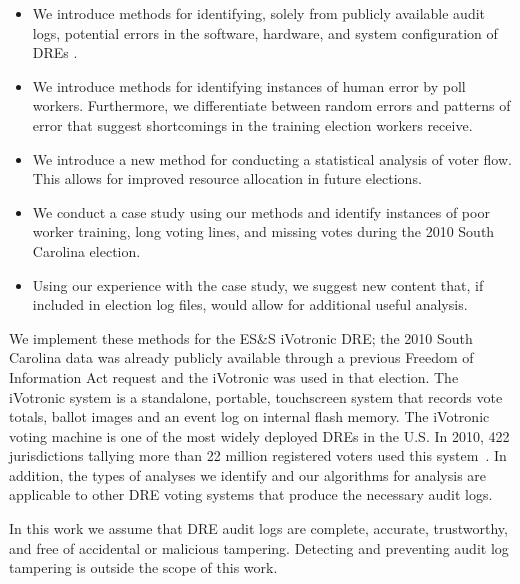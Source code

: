 \documentclass[letterpaper,twocolumn,10pt]{article}
\begin{document}
\begin{itemize}
\item We introduce methods for identifying, solely from publicly available audit
  logs, potential errors in the software, hardware, and system configuration of
  DREs .
\item We introduce methods for identifying instances of human error by poll
  workers. Furthermore, we differentiate between random
  errors and patterns of error that suggest shortcomings in the training
  election workers receive.
\item We introduce a new method for conducting a statistical analysis of voter
  flow. This allows for improved resource allocation in future elections.
\item We conduct a case study using our methods and identify instances of poor
  worker training, long voting lines, and missing votes during the 2010 South
  Carolina election.
\item Using our experience with the case study, we suggest new content that, if
  included in election log files, would allow for additional useful analysis.
\end{itemize}

We implement these methods for the ES\&S 
iVotronic DRE; the 2010 South Carolina data was already publicly available 
through a previous Freedom of Information Act request and the iVotronic was 
used in that election. The iVotronic system is a standalone, portable, 
touchscreen system that records vote totals, ballot images and an event log 
on internal flash memory. The iVotronic voting machine is one of the most 
widely deployed DREs in the U.S. In 2010, 422 jurisdictions tallying more 
than 22 million registered voters used this system~\cite{VerVot2010}. In 
addition, the types of analyses we identify and our algorithms for analysis 
are applicable to other DRE voting systems that produce the necessary audit 
logs. 

In this work we assume that DRE audit logs are complete, accurate, trustworthy,
and free of accidental or malicious tampering. Detecting and preventing audit
log tampering is outside the scope of this work. 
\end{document}
